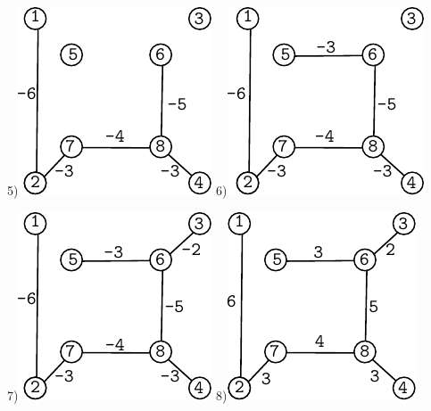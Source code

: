 \documentclass{article}
\begin{document}
\begin{center}
5)\includegraphics[scale=1]{kruskal/p6}
\hspace{10mm}
6)\includegraphics[scale=1]{kruskal/p7}
\end{center}

\begin{center}
7)\includegraphics[scale=1]{kruskal/p8}
\hspace{10mm}
8)\includegraphics[scale=1]{kruskal/p9}
\end{center}
\end{document}

